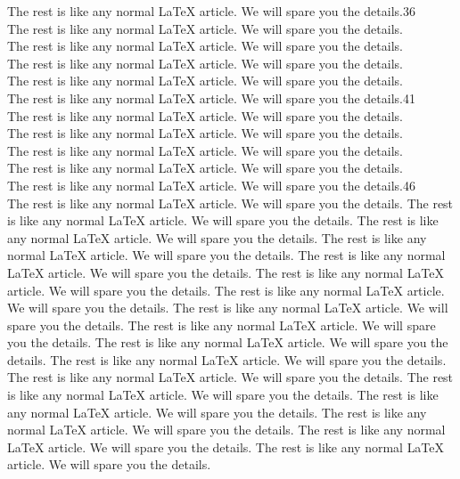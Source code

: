 \documentclass[submission,copyright,creativecommons]{eptcs}
\begin{document}
The rest is like any normal {\LaTeX} article.
We will spare you the details.\hfill36\\
The rest is like any normal {\LaTeX} article.
We will spare you the details.\\
The rest is like any normal {\LaTeX} article.
We will spare you the details.\\
The rest is like any normal {\LaTeX} article.
We will spare you the details.\\
The rest is like any normal {\LaTeX} article.
We will spare you the details.\\
The rest is like any normal {\LaTeX} article.
We will spare you the details.\hfill41\\
The rest is like any normal {\LaTeX} article.
We will spare you the details.\\
The rest is like any normal {\LaTeX} article.
We will spare you the details.\\
The rest is like any normal {\LaTeX} article.
We will spare you the details.\\
The rest is like any normal {\LaTeX} article.
We will spare you the details.\\
The rest is like any normal {\LaTeX} article.
We will spare you the details.\hfill46\\
The rest is like any normal {\LaTeX} article.
We will spare you the details.
The rest is like any normal {\LaTeX} article.
We will spare you the details.
The rest is like any normal {\LaTeX} article.
We will spare you the details.
The rest is like any normal {\LaTeX} article.
We will spare you the details.
The rest is like any normal {\LaTeX} article.
We will spare you the details.
The rest is like any normal {\LaTeX} article.
We will spare you the details.
The rest is like any normal {\LaTeX} article.
We will spare you the details.
The rest is like any normal {\LaTeX} article.
We will spare you the details.
The rest is like any normal {\LaTeX} article.
We will spare you the details.
The rest is like any normal {\LaTeX} article.
We will spare you the details.
The rest is like any normal {\LaTeX} article.
We will spare you the details.
The rest is like any normal {\LaTeX} article.
We will spare you the details.
The rest is like any normal {\LaTeX} article.
We will spare you the details.
The rest is like any normal {\LaTeX} article.
We will spare you the details.
The rest is like any normal {\LaTeX} article.
We will spare you the details.
The rest is like any normal {\LaTeX} article.
We will spare you the details.
The rest is like any normal {\LaTeX} article.
We will spare you the details.
\end{document}
